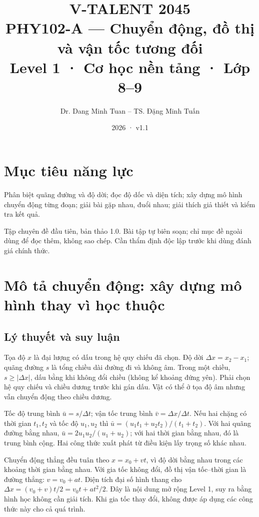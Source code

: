 \documentclass[11pt,a4paper,openany]{book}
\begin{document}
\title{V-TALENT 2045\\ PHY102-A --- Chuyển động, đồ thị và vận tốc tương đối\\\large Level 1 · Cơ học nền tảng · Lớp 8–9}
\author{Dr. Dang Minh Tuan -- TS. Đặng Minh Tuấn}
\date{2026 · v1.1}
\maketitle
\tableofcontents
\chapter*{Mục tiêu năng lực}
Phân biệt quãng đường và độ dời; đọc độ dốc và diện tích; xây dựng mô hình chuyển động từng đoạn; giải bài gặp nhau, đuổi nhau; giải thích giả thiết và kiểm tra kết quả.

Tập chuyên đề đầu tiên, bản thảo 1.0. Bài tập tự biên soạn; chỉ mục đề ngoài dùng để đọc thêm, không sao chép. Cần thẩm định độc lập trước khi dùng đánh giá chính thức.
\chapter{Mô tả chuyển động: xây dựng mô hình thay vì học thuộc}
\section{Lý thuyết và suy luận}
Tọa độ $x$ là đại lượng có dấu trong hệ quy chiếu đã chọn. Độ dời $\Delta x=x_2-x_1$; quãng đường $s$ là tổng chiều dài đường đi và không âm. Trong một chiều, $s\geq|\Delta x|$, dấu bằng khi không đổi chiều (không kể khoảng đứng yên). Phải chọn hệ quy chiếu và chiều dương trước khi gán dấu. Vật có thể ở tọa độ âm nhưng vẫn chuyển động theo chiều dương.

Tốc độ trung bình $\bar u=s/\Delta t$; vận tốc trung bình $\bar v=\Delta x/\Delta t$. Nếu hai chặng có thời gian $t_1,t_2$ và tốc độ $u_1,u_2$ thì $\bar u=(u_1t_1+u_2t_2)/(t_1+t_2)$. Với hai quãng đường bằng nhau, $\bar u=2u_1u_2/(u_1+u_2)$; với hai thời gian bằng nhau, đó là trung bình cộng. Hai công thức xuất phát từ điều kiện lấy trọng số khác nhau.

Chuyển động thẳng đều tuân theo $x=x_0+vt$, vì độ dời bằng nhau trong các khoảng thời gian bằng nhau. Với gia tốc không đổi, đồ thị vận tốc--thời gian là đường thẳng: $v=v_0+at$. Diện tích đại số hình thang cho $\Delta x=(v_0+v)t/2=v_0t+at^2/2$. Đây là nội dung mở rộng Level 1, suy ra bằng hình học không cần giải tích. Khi gia tốc thay đổi, không được áp dụng các công thức này cho cả quá trình.
\end{document}
